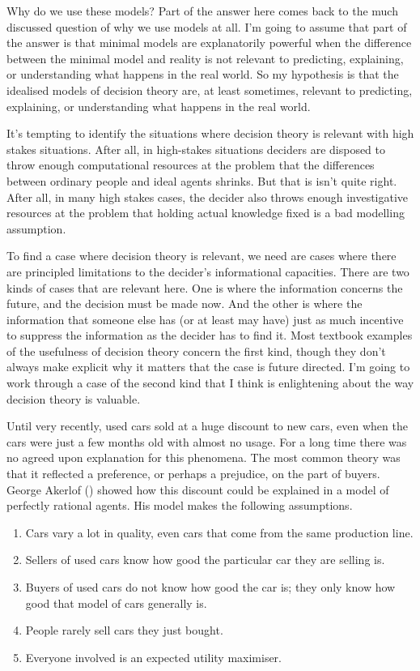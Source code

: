 \documentclass[
  12pt,
  letterpaper,
  DIV=11,
  numbers=noendperiod,
  twoside]{scrartcl}
\providecommand{\tightlist}{%
  \setlength{\itemsep}{0pt}\setlength{\parskip}{0pt}}
\begin{document}
Why do we use these models? Part of the answer here comes back to the
much discussed question of why we use models at all. I'm going to assume
that part of the answer is that minimal models are explanatorily
powerful when the difference between the minimal model and reality is
not relevant to predicting, explaining, or understanding what happens in
the real world. So my hypothesis is that the idealised models of
decision theory are, at least sometimes, relevant to predicting,
explaining, or understanding what happens in the real world.

It's tempting to identify the situations where decision theory is
relevant with high stakes situations. After all, in high-stakes
situations deciders are disposed to throw enough computational resources
at the problem that the differences between ordinary people and ideal
agents shrinks. But that is isn't quite right. After all, in many high
stakes cases, the decider also throws enough investigative resources at
the problem that holding actual knowledge fixed is a bad modelling
assumption.

To find a case where decision theory is relevant, we need are cases
where there are principled limitations to the decider's informational
capacities. There are two kinds of cases that are relevant here. One is
where the information concerns the future, and the decision must be made
now. And the other is where the information that someone else has (or at
least may have) just as much incentive to suppress the information as
the decider has to find it. Most textbook examples of the usefulness of
decision theory concern the first kind, though they don't always make
explicit why it matters that the case is future directed. I'm going to
work through a case of the second kind that I think is enlightening
about the way decision theory is valuable.

Until very recently, used cars sold at a huge discount to new cars, even
when the cars were just a few months old with almost no usage. For a
long time there was no agreed upon explanation for this phenomena. The
most common theory was that it reflected a preference, or perhaps a
prejudice, on the part of buyers. George Akerlof
() showed how this discount could be
explained in a model of perfectly rational agents. His model makes the
following assumptions.

\begin{enumerate}
\def\labelenumi{\arabic{enumi}.}
\tightlist
\item
  Cars vary a lot in quality, even cars that come from the same
  production line.
\item
  Sellers of used cars know how good the particular car they are selling
  is.
\item
  Buyers of used cars do not know how good the car is; they only know
  how good that model of cars generally is.
\item
  People rarely sell cars they just bought.
\item
  Everyone involved is an expected utility maximiser.
\end{enumerate}
\end{document}
